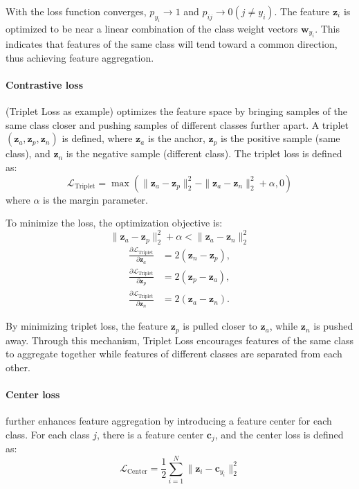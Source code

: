 With the loss function converges, $p_{y_i}\rightarrow1$ and $p_{ij}\rightarrow0 (j \neq y_i)$. The feature $\mathbf{z}_i$ is optimized to be near a linear combination of the class weight vectors $\mathbf{w}_{y_i}$. This indicates that features of the same class will tend toward a common direction, thus achieving feature aggregation.

\paragraph{Contrastive loss} (Triplet Loss as example) optimizes the feature space by bringing samples of the same class closer and pushing samples of different classes further apart. A triplet $(\mathbf{z}_a, \mathbf{z}_p, \mathbf{z}_n)$ is defined, where $\mathbf{z}_a$ is the anchor, $\mathbf{z}_p$ is the positive sample (same class), and $\mathbf{z}_n$ is the negative sample (different class). The triplet loss is defined as:
\begin{equation}
\mathcal{L}_{\text{Triplet}} = \max \left( \| \mathbf{z}_a - \mathbf{z}_p \|_2^2 - \| \mathbf{z}_a - \mathbf{z}_n \|_2^2 + \alpha, 0 \right)
\end{equation}
where $\alpha$ is the margin parameter.

To minimize the loss, the optimization objective is:
\begin{equation}
\| \mathbf{z}_a - \mathbf{z}_p \|_2^2 + \alpha < \| \mathbf{z}_a - \mathbf{z}_n \|_2^2
\end{equation}
\begin{align}
\frac{\partial \mathcal{L}_{\text{Triplet}}}{\partial \mathbf{z}_a} &= 2 (\mathbf{z}_n - \mathbf{z}_p), \\
\frac{\partial \mathcal{L}_{\text{Triplet}}}{\partial \mathbf{z}_p} &= 2 (\mathbf{z}_p - \mathbf{z}_a), \\
\frac{\partial \mathcal{L}_{\text{Triplet}}}{\partial \mathbf{z}_n} &= 2 (\mathbf{z}_a - \mathbf{z}_n).
\end{align}

By minimizing triplet loss, the feature $\mathbf{z}_p$ is pulled closer to $\mathbf{z}_a$, while $\mathbf{z}_n$ is pushed away. Through this mechanism, Triplet Loss encourages features of the same class to aggregate together while features of different classes are separated from each other.

\paragraph{Center loss} further enhances feature aggregation by introducing a feature center for each class. For each class $j$, there is a feature center $\mathbf{c}_j$, and the center loss is defined as:
\begin{equation}
\mathcal{L}_{\text{Center}} = \frac{1}{2} \sum_{i=1}^{N} \| \mathbf{z}_i - \mathbf{c}_{y_i} \|_2^2
\end{equation}


